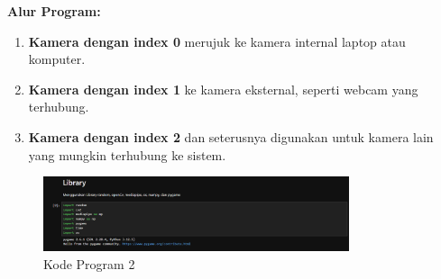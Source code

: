 \documentclass[11pt,a4paper]{article}
\begin{document}
\textbf{Alur Program:}
\begin{enumerate}
    \item \textbf{Kamera dengan index 0} merujuk ke kamera internal laptop atau komputer.
    \item \textbf{Kamera dengan index 1} ke kamera eksternal, seperti webcam yang terhubung.
    \item \textbf{Kamera dengan index 2} dan seterusnya digunakan untuk kamera lain yang mungkin terhubung ke sistem.
\end{enumerate}

\begin{figure}[H]
    \centering
    \includegraphics[width=0.8\textwidth]{2.png} %
    \caption{Kode Program 2}
    \label{fig:2}
\end{figure}
\end{document}
